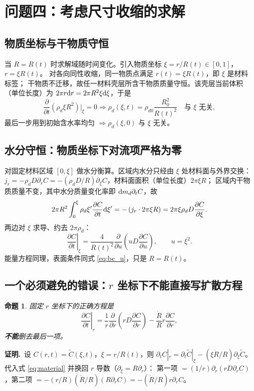 \documentclass[withoutpreface,bwprint]{cumcmthesis}
\newtheorem{proposition}{命题}
\begin{document}
\section{问题四：考虑尺寸收缩的求解}
\label{sec:shrink}

\subsection{物质坐标与干物质守恒}

当 $R=R(t)$ 时求解域随时间变化。引入物质坐标 $\xi=r/R(t)\in[0,1]$，$r=\xi R(t)$。
对各向同性收缩，同一物质点满足 $r(t)=\xi R(t)$，即 $\xi$ 是材料标签；
干物质不迁移，故任一材料壳层所含干物质质量守恒。该壳层当前体积（单位长度）为
$2\pi r{\rm d}r=2\pi R^2\xi{\rm d}\xi$，于是
\[
\frac{\partial}{\partial t}\left(\rho_d\xi R^2\right)\Big|_\xi=0
\Longrightarrow
\rho_d(\xi,t)=\rho_{d0}\frac{R_0^2}{R(t)^2}\quad\text{与 }\xi\text{ 无关},
\]
最后一步用到初始含水率均匀 $\Rightarrow\rho_d(\xi,0)$ 与 $\xi$ 无关。

\subsection{水分守恒：物质坐标下对流项严格为零}

对固定材料区域 $[0,\xi]$ 做水分衡算。区域内水分只经由 $\xi$ 处材料面与外界交换：
$j_r=-\rho_dD\partial_rC=-(\rho_dD/R)\partial_\xi C$，材料面面积（单位长度）$2\pi\xi R$；
区域内干物质质量不变，其中水分质量变化率即 ${\rm d}m_d\partial_tC$，故
\[
2\pi R^2\int_0^\xi\rho_d\xi'\frac{\partial C}{\partial t}{\rm d}\xi'
=-\left(j_r\cdot2\pi\xi R\right)=2\pi\xi\rho_dD\frac{\partial C}{\partial\xi}.
\]
两边对 $\xi$ 求导、约去 $2\pi\rho_d$：
\begin{equation}
\boxed{\;\left.\frac{\partial C}{\partial t}\right|_\xi
=\frac{4}{R(t)^2}\frac{\partial}{\partial u}\left(uD\frac{\partial C}{\partial u}\right),
\qquad u=\xi^2 .\;}
\label{eq:material}
\end{equation}
能量方程同理，表面条件同式 \eqref{eq:bc_u}，只是 $R=R(t)$。

\subsection{一个必须避免的错误：$r$ 坐标下不能直接写扩散方程}

\begin{proposition}
固定 $r$ 坐标下的正确方程是
\begin{equation}
\left.\frac{\partial C}{\partial t}\right|_r
=\frac{1}{r}\frac{\partial}{\partial r}\left(rD\frac{\partial C}{\partial r}\right)
-\frac{\dot R}{R}r\frac{\partial C}{\partial r},
\label{eq:radv}
\end{equation}
\textbf{不能}删去最后一项。
\end{proposition}
\noindent\textbf{证明.}\ 
设 $C(r,t)=\tilde C(\xi,t)$，$\xi=r/R(t)$，则
$\partial_tC|_r=\partial_t\tilde C|_\xi-(\xi\dot R/R)\partial_\xi\tilde C$。
代入式 \eqref{eq:material} 并换回 $r$ 导数（$\partial_\xi=R\partial_r$）：
第一项 $=(1/r)\partial_r(rD\partial_rC)$，第二项
$=-(r/R)(\dot R/R)(R\partial_rC)=-(\dot R/R)r\partial_rC$。
\end{document}
